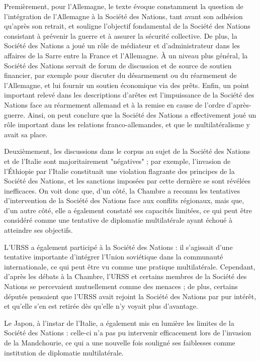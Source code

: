 \documentclass[a4paper,twoside,12pt]{book}
\begin{document}
Premièrement, pour l'Allemagne, le texte évoque constamment la question de l'intégration de l'Allemagne à la Société des Nations, tant avant son adhésion qu'après son retrait, et souligne l'objectif fondamental de la Société des Nations consistant à prévenir la guerre et à assurer la sécurité collective. De plus, la Société des Nations a joué un rôle de médiateur et d'administrateur dans les affaires de la Sarre entre la France et l'Allemagne. À un niveau plus général, la Société des Nations servait de forum de discussion et de source de soutien financier, par exemple pour discuter du désarmement ou du réarmement de l'Allemagne, et lui fournir un soutien économique via des prêts. Enfin, un point important relevé dans les descriptions d'arêtes est l'impuissance de la Société des Nations face au réarmement allemand et à la remise en cause de l'ordre d'après-guerre. Ainsi, on peut conclure que la Société des Nations a effectivement joué un rôle important dans les relations franco-allemandes, et que le multilatéralisme y avait sa place.

Deuxièmement, les discussions dans le corpus au sujet de la Société des Nations et de l'Italie sont majoritairement "négatives" ; par exemple, l'invasion de l'Éthiopie par l'Italie constituait une violation flagrante des principes de la Société des Nations, et les sanctions imposées par cette dernière se sont révélées inefficaces. On voit donc que, d'un côté, la Chambre a reconnu les tentatives d'intervention de la Société des Nations face aux conflits régionaux, mais que, d'un autre côté, elle a également constaté ses capacités limitées, ce qui peut être considéré comme une tentative de diplomatie multilatérale ayant échoué à atteindre ses objectifs.

L'URSS a également participé à la Société des Nations : il s'agissait d'une tentative importante d'intégrer l'Union soviétique dans la communauté internationale, ce qui peut être vu comme une pratique multilatérale. Cependant, d'après les débats à la Chambre, l'URSS et certains membres de la Société des Nations se percevaient mutuellement comme des menaces ; de plus, certains députés pensaient que l'URSS avait rejoint la Société des Nations par pur intérêt, et qu'elle s'en est retirée dès qu'elle n'y voyait plus d'avantage.

Le Japon, à l'instar de l'Italie, a également mis en lumière les limites de la Société des Nations : celle-ci n'a pas pu intervenir efficacement lors de l'invasion de la Mandchourie, ce qui a une nouvelle fois souligné ses faiblesses comme institution de diplomatie multilatérale.
\end{document}
